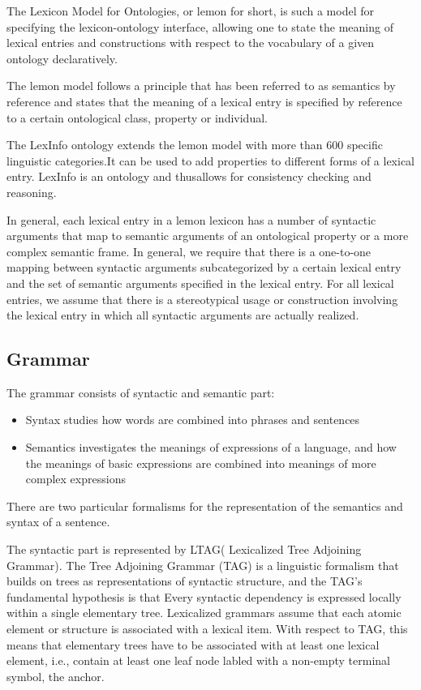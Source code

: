 The Lexicon Model for Ontologies, or lemon for short, is such a model for specifying the lexicon-ontology interface, allowing one to state the meaning of lexical entries and constructions with respect to the vocabulary of a given ontology declaratively.

The lemon model follows a principle that has been referred to as semantics by reference and states that the meaning of a lexical entry is specified by reference to a certain ontological class, property or individual.

The LexInfo ontology extends the lemon model with more than 600 specific linguistic categories.It can be used to add properties to different forms of a lexical entry. LexInfo is an ontology and thusallows for consistency checking and reasoning. 

In general, each lexical entry in a lemon lexicon has a number of syntactic arguments that map to semantic arguments of an ontological property or a more complex semantic frame. In general, we require that there is a one-to-one mapping between syntactic arguments subcategorized by a certain lexical entry and the set of semantic arguments specified in the lexical entry. For all lexical entries, we assume that there is a stereotypical usage or construction involving the lexical entry in which all syntactic arguments are actually realized.

\subsection{Grammar}
The grammar consists of syntactic and semantic part:
\begin{itemize} 
  \item Syntax studies how words are combined into phrases and sentences
  \item Semantics investigates the meanings of expressions of a language, and how the meanings of basic expressions are combined into meanings of more complex expressions
\end{itemize} 
There are two particular formalisms for the representation of the semantics and syntax of a sentence.

The syntactic part is represented by LTAG( Lexicalized Tree Adjoining Grammar).  
The Tree Adjoining Grammar (TAG) is a linguistic formalism that builds on trees as representations of syntactic structure, and the TAG's fundamental hypothesis is that Every syntactic dependency is expressed locally within a single elementary tree. Lexicalized grammars assume that each atomic element or structure is associated with a lexical item. With respect to TAG, this means that elementary trees have to be associated with at least one lexical element, i.e., contain at least one leaf node labled with a non-empty terminal symbol, the anchor.

